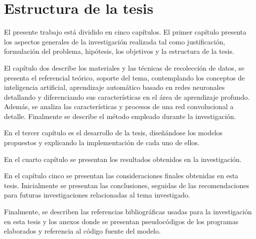\section{Estructura de la tesis}

	\vskip 0.1cm
	El presente trabajo está dividido en cinco capítulos. El primer capítulo presenta los aspectos generales de la investigación realizada tal como justificación, formulación del problema, hipótesis, los objetivos y la estructura de la tesis.

	El capítulo dos describe los materiales y las técnicas de recolección de datos, se presenta el referencial teórico, soporte del tema, contemplando los conceptos de inteligencia artificial, aprendizaje automático basado en redes neuronales detallando y diferenciando sus características en el área de aprendizaje profundo. Además, se analiza las características y procesos de una red convolucional a detalle. Finalmente se describe el método empleado durante la investigación.

	En el tercer capítulo es el desarrollo de la tesis, diseñándose los modelos propuestos y explicando la implementación de cada uno de ellos.
	
	En el cuarto capítulo se presentan los resultados obtenidos en la investigación.

	En el capítulo cinco se presentan las consideraciones finales obtenidas en esta tesis. Inicialmente se presentan las conclusiones, seguidas de las recomendaciones para futuras investigaciones relacionadas al tema investigado.

	Finalmente, se describen las referencias bibliográficas usadas para la investigación en esta tesis y los anexos donde se presentan pseudocódigos de los programas elaborados y referencia al código fuente del modelo.


